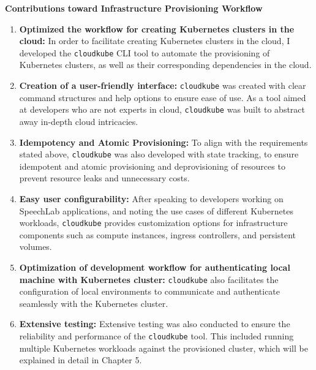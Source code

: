 \textbf{Contributions toward Infrastructure Provisioning Workflow}
\vspace{-1em}
\begin{enumerate}[label=\alph*., itemsep=0pt]
    \item \textbf{Optimized the workflow for creating Kubernetes clusters in the cloud:} In order to facilitate creating Kubernetes clusters in the cloud, I developed the \texttt{cloudkube} CLI tool to automate the provisioning of Kubernetes clusters, as well as their corresponding dependencies in the cloud.
    \item \textbf{Creation of a user-friendly interface:} \texttt{cloudkube} was created with clear command structures and help options to ensure ease of use. As a tool aimed at developers who are not experts in cloud, \texttt{cloudkube} was built to abstract away in-depth cloud intricacies.
    \item \textbf{Idempotency and Atomic Provisioning:} To align with the requirements stated above, \texttt{cloudkube} was also developed with state tracking, to ensure idempotent and atomic provisioning and deprovisioning of resources to prevent resource leaks and unnecessary costs.
    \item \textbf{Easy user configurability:} After speaking to developers working on SpeechLab applications, and noting the use cases of different Kubernetes workloads, \texttt{cloudkube} provides customization options for infrastructure components such as compute instances, ingress controllers, and persistent volumes.
    \item \textbf{Optimization of development workflow for authenticating local machine with Kubernetes cluster:} \texttt{cloudkube} also facilitates the configuration of local environments to communicate and authenticate seamlessly with the Kubernetes cluster.
    \item \textbf{Extensive testing: } Extensive testing was also conducted to ensure the reliability and performance of the \texttt{cloudkube} tool. This included running multiple Kubernetes workloads against the provisioned cluster, which will be explained in detail in Chapter 5.
\end{enumerate}

